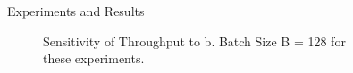 \documentclass[final]{beamer}
\newlength{\sepwid}
\newlength{\onecolwid}
\newlength{\twocolwid}
\begin{document}
\begin{frame}
\begin{columns}[t]
\begin{column}{\twocolwid}
\begin{columns}[t,totalwidth=\twocolwid]
\begin{column}{\twocolwid}
\begin{exampleblock}{Experiments and Results}
\begin{multicols}{3}
\begin{figure}
\caption{Sensitivity of Throughput to b. Batch Size B = 128 for these experiments.}
\end{figure}

\end{multicols}
\end{exampleblock}


\end{column} %
\begin{column}{\sepwid}\end{column} %
\end{columns} %

\end{column} %

\begin{column}{\sepwid}\end{column} %


\begin{column}{\onecolwid} %


\end{column}
\end{columns}
\end{frame}
\end{document}
